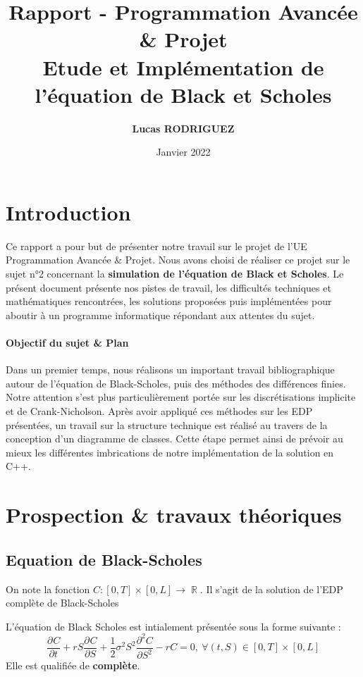 \documentclass[11pt,a4paper]{article}
\title{\textbf{Rapport - Programmation Avancée \& Projet} \\[0.2em]\smaller{} Etude et Implémentation de l'équation de Black et Scholes}
\author{\textbf{Lucas RODRIGUEZ}}
\date{Janvier 2022}
\newcommand{\deriv}[3][]{%
  \ensuremath{\frac{\partial^{#1} {#2}}{\partial {#3}^{#1}}}}
\theoremstyle{plain}
\DeclareMathOperator{\R}{\mathbb{R}}
\begin{document}
\maketitle

\section*{Introduction}
Ce rapport a pour but de présenter notre travail sur le projet de l'UE Programmation Avancée \& Projet.
Nous avons choisi de réaliser ce projet sur le sujet n°2 concernant la \textbf{simulation de l'équation de Black et Scholes}. Le présent document présente nos pistes de travail, les difficultés techniques et mathématiques rencontrées, les solutions proposées puis implémentées pour aboutir à un programme informatique répondant aux attentes du sujet.

\paragraph{Objectif du sujet \& Plan} Dans un premier temps, nous réalisons un important travail bibliographique autour de l'équation de Black-Scholes, puis des méthodes des différences finies. Notre attention s'est plus particulièrement portée sur les discrétisations implicite et de Crank-Nicholson.
Après avoir appliqué ces méthodes sur les EDP présentées, un travail sur la structure technique est réalisé au travers de la conception d'un diagramme de classes. Cette étape permet ainsi de prévoir au mieux les différentes imbrications de notre implémentation de la solution en C++.


\tableofcontents



\newpage 


\section{Prospection \& travaux théoriques}

\subsection{Equation de Black-Scholes}
On note la fonction $C : \left[0, T\right]\times\left[0, L\right] \longrightarrow \R$. Il s'agit de la solution de l'EDP complète de Black-Scholes 

L'équation de Black Scholes est intialement présentée sous la forme suivante :
\begin{equation}
    \label{eq:EDP_complete}
    \deriv{C}{t} + rS\deriv{C}{S} + \frac{1}{2}\sigma^2S^2\deriv[2]{C}{S} - rC = 0, \ \forall (t, S) \in \left[0, T\right]\times\left[0, L\right]
\end{equation}
Elle est qualifiée de \textbf{complète}.
\end{document}
